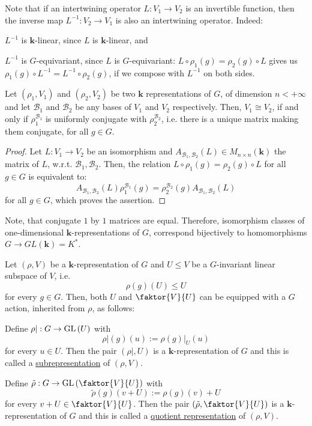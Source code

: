 Note that if an intertwining operator $L:V_1\to V_2$ is an invertible function, then the inverse map $L^{-1}:V_2\to V_1$ is also an intertwining operator. Indeed:
\begin{i_enum}
\item $L^{-1}$ is $\mathbf{k}$-linear, since $L$ is $\mathbf{k}$-linear, and
\item $L^{-1}$ is $G$-equivariant, since $L$ is $G$-equivariant: $L\circ\rho_1(g)=\rho_2(g)\circ L$ gives us $\rho_1(g)\circ L^{-1}=L^{-1}\circ\rho_2(g)$, if we compose with $L^{-1}$ on both sides.
\end{i_enum}

\begin{proposition} Let $(\rho_1,V_1)$ and $(\rho_2,V_2)$ be two $\mathbf{k}$ representations of $G$, of dimension $n<+\infty$ and let $\mathcal{B}_1$ and $\mathcal{B}_2$ be any bases of $V_1$ and $V_2$ respectively. Then, $V_1\cong V_2$, if and only if $\rho_1^{\mathcal{B}_1}$ is uniformly conjugate with $\rho_2^{\mathcal{B}_2}$, i.e. there is a unique matrix making them conjugate, for all $g\in G$.
\end{proposition}
\begin{proof} Let $L:V_1\to V_2$ be an isomorphism and $A_{\mathcal{B}_1,\mathcal{B}_2}(L)\in M_{n\times n}(\mathbf{k})$ the matrix of $L$, w.r.t. $\mathcal{B}_1,\mathcal{B}_2$. Then, the relation $L\circ\rho_1(g)=\rho_2(g)\circ L$ for all $g\in G$ is equivalent to:
$$A_{\mathcal{B}_1,\mathcal{B}_2}(L)\rho_1^{\mathcal{B}_1}(g)=\rho_2^{\mathcal{B}_2}(g)A_{\mathcal{B}_1,\mathcal{B}_2}(L)$$
for all $g\in G$, which proves the assertion.
\end{proof}

\begin{remark}\label{rem:one_conj} Note, that conjugate $1$ by $1$ matrices are equal. Therefore, isomorphism classes of one-dimensional $\mathbf{k}$-representations of $G$, correspond bijectively to homomorphisms $G\to GL(\mathbf{k})=K^*$.
\end{remark}

\begin{definition} Let $(\rho, V)$ be a $\mathbf{k}$-representation of $G$ and $U\leq V$ be a $G$-invariant linear subspace of $V$, i.e.
$$\rho(g)(U)\leq U$$
for every $g\in G$. Then, both $U$ and $\faktor{V}{U}$ can be equipped with a $G$ action, inherited from $\rho$, as follows:
\begin{i_enum}
\item Define $\rho|:G\to\GL{U}$ with
$$\rho|(g)(u):=\rho(g)|_U(u)$$
for every $u\in U$. Then the pair $(\rho|,U)$ is a $\mathbf{k}$-representation of $G$ and this is called a \ul{subrepresentation} of $(\rho,V)$.
\item Define $\tilde{\rho}:G\to\GL{\faktor{V}{U}}$ with
$$\tilde{\rho}(g)(v+U):=\rho(g)(v)+U$$
for every $v+U\in\faktor{V}{U}$. Then the pair $(\tilde{\rho},\faktor{V}{U})$ is a $\mathbf{k}$-representation of $G$ and this is called a \ul{quotient representation} of $(\rho,V)$.
\end{i_enum}
\end{definition}

